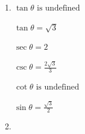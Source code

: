\documentclass[11pt]{article}
\begin{document}
\begin{enumerate}
{\(\cot\left(\pi\right) =\)

\(\sec\left(\frac{11\pi}{6}\right) =\)

}

\newpage

% 

\item %
\providecommand{\stxKnowl}{}\renewcommand{\stxKnowl}[1]{#1}
\providecommand{\stxOuttro}{}\renewcommand{\stxOuttro}[1]{#1}
\providecommand{\stxTitle}{}\renewcommand{\stxTitle}[1]{#1}
\renewcommand{\stxOuttro}[1]{}
\stxKnowl{
\(\tan\theta \text{ is undefined}\)

\(\tan\theta = \sqrt{3}\)

\(\sec\theta = 2\)

\(\csc\theta = \frac{2\sqrt{3}}{3}\)

\(\cot\theta \text{ is undefined}\)

\(\sin\theta = \frac{\sqrt{3}}{2}\)

\stxOuttro{
\textbf{Solutions:}

(a) \(\theta \in \{ 90^\circ, 270^\circ \}\)

(b) \(\theta \in \{ 60^\circ, 240^\circ \}\)

(c) \(\theta \in \{ 60^\circ, 300^\circ \}\)

(d) \(\theta \in \{ \frac{1}{3} \, \pi, \frac{2}{3} \, \pi \}\)

(e) \(\theta \in \{ 0, \pi \}\)

(f) \(\theta \in \{ \frac{1}{3} \, \pi, \frac{2}{3} \, \pi \}\)

}
}

\newpage

% 

\item %
\providecommand{\stxKnowl}{}\renewcommand{\stxKnowl}[1]{#1}
\providecommand{\stxOuttro}{}\renewcommand{\stxOuttro}[1]{#1}
\providecommand{\stxTitle}{}\renewcommand{\stxTitle}[1]{#1}
\renewcommand{\stxOuttro}[1]{}
\stxKnowl{

}
\end{enumerate}
\end{document}
